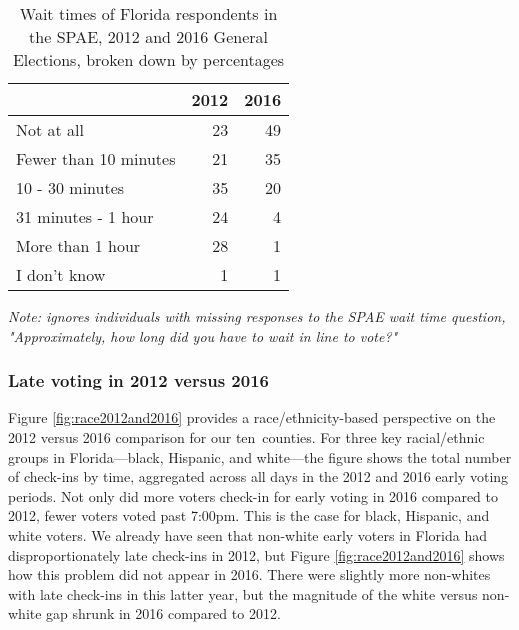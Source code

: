 \documentclass[12pt,titlepage]{article}
\newcommand{\numcounties}{ten}
\begin{document}
\begin{table}[ht]
\centering
\caption{Wait times of Florida respondents in the SPAE, 2012 and 2016
  General Elections, broken down by percentages} 
\label{tab:floridaspae}
\begin{tabular}{lrr}
  \hline
 & 2012 & 2016 \\ 
  \hline
  Not at all &  23 &  49 \\ 
  Fewer than 10 minutes &  21 &  35 \\ 
  10 - 30 minutes &  35 &  20 \\ 
  31 minutes - 1 hour &  24 &   4 \\ 
  More than 1 hour &  28 &   1 \\ 
  I don't know &   1 &   1 \\ 
   \hline
\end{tabular}
\begin{flushleft}
  \emph{Note: ignores individuals with missing responses to the SPAE
    wait time question, "Approximately, how long did you have to wait
    in line to vote?"}
\end{flushleft}
\end{table}

% 

\subsubsection*{Late voting in 2012 versus 2016}

Figure \ref{fig:race2012and2016} provides a race/ethnicity-based
perspective on the 2012 versus 2016 comparison for our \numcounties\
counties.  For three key racial/ethnic groups in Florida---black,
Hispanic, and white---the figure shows the total number of check-ins
by time, aggregated across all days in the 2012 and 2016 early voting
periods.  Not only did more voters check-in for early voting in 2016
compared to 2012, fewer voters voted past 7:00pm. This is the case for
black, Hispanic, and white voters. We already have seen that non-white
early voters in Florida had disproportionately late check-ins in 2012,
but Figure \ref{fig:race2012and2016} shows how this problem did not
appear in 2016. There were slightly more non-whites with late
check-ins in this latter year, but the magnitude of the white versus
non-white gap shrunk in 2016 compared to 2012.
\end{document}
